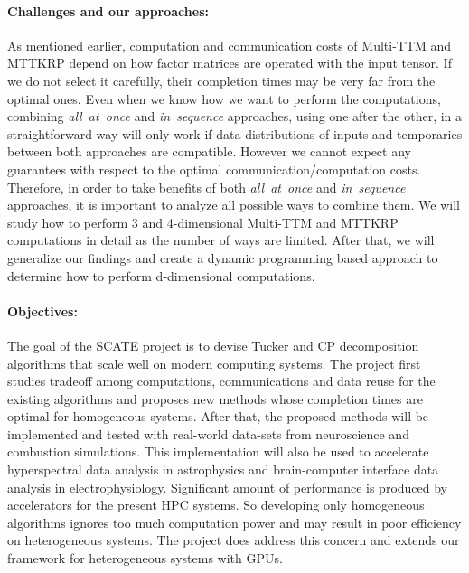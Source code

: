 \documentclass[a4paper,11pt]{article}
\begin{document}
    \vspace*{-0.325cm}\paragraph{Challenges and our approaches:} As mentioned earlier, computation and communication costs of Multi-TTM and MTTKRP depend on how factor matrices are operated with the input tensor. If we do not select it carefully, their completion times may be very far from the optimal ones. Even when we know how we want to perform the computations, combining \emph{all~at~once} and \emph{in~sequence} approaches, using one after the other, in a straightforward way will only work if data distributions of inputs and temporaries between both approaches are compatible. However we cannot expect any guarantees with respect to the optimal communication/computation costs. Therefore, in order to take benefits of both \emph{all~at~once} and \emph{in~sequence} approaches, it is important to analyze all possible ways to combine them. We will study how to perform 3 and 4-dimensional Multi-TTM and MTTKRP computations in detail as the number of ways are limited. After that, we will generalize our findings and create a dynamic programming based approach to determine how to perform d-dimensional computations.
    
   	\vspace*{-0.325cm}\paragraph{Objectives:} The goal of the SCATE project is to devise Tucker and CP decomposition algorithms that scale well on modern computing systems. The project first studies tradeoff among computations, communications and data reuse for the existing algorithms and proposes new methods whose completion times are optimal for homogeneous systems. After that, the proposed methods will be implemented and tested with real-world data-sets from neuroscience and combustion simulations. This implementation will also be used to accelerate hyperspectral data analysis in astrophysics and brain-computer interface data analysis in electrophysiology. Significant amount of performance is produced by accelerators for the present HPC systems. So developing only homogeneous algorithms ignores too much computation power and may result in poor efficiency on heterogeneous systems. The project does address this concern and extends our framework for heterogeneous systems with GPUs.
   	
\end{document}
